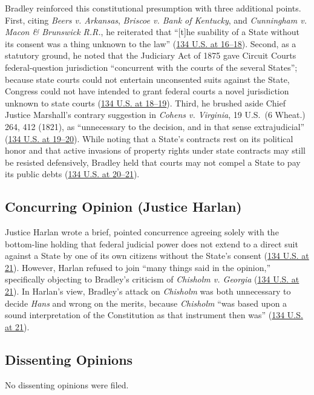\documentclass[12pt]{article}
\begin{document}
Bradley reinforced this constitutional presumption with three additional points. First, citing \textit{Beers v. Arkansas}, \textit{Briscoe v. Bank of Kentucky}, and \textit{Cunningham v. Macon \& Brunswick R.R.}, he reiterated that ``[t]he suability of a State without its consent was a thing unknown to the law'' (\href{https://supreme.justia.com/cases/federal/us/134/1/}{134 U.S. at 16--18}). Second, as a statutory ground, he noted that the Judiciary Act of 1875 gave Circuit Courts federal-question jurisdiction ``concurrent with the courts of the several States''; because state courts could not entertain unconsented suits against the State, Congress could not have intended to grant federal courts a novel jurisdiction unknown to state courts (\href{https://supreme.justia.com/cases/federal/us/134/1/}{134 U.S. at 18--19}). Third, he brushed aside Chief Justice Marshall's contrary suggestion in \textit{Cohens v. Virginia}, 19 U.S.\ (6 Wheat.) 264, 412 (1821), as ``unnecessary to the decision, and in that sense extrajudicial'' (\href{https://supreme.justia.com/cases/federal/us/134/1/}{134 U.S. at 19--20}). While noting that a State's contracts rest on its political honor and that active invasions of property rights under state contracts may still be resisted defensively, Bradley held that courts may not compel a State to pay its public debts (\href{https://supreme.justia.com/cases/federal/us/134/1/}{134 U.S. at 20--21}).

\subsection{Concurring Opinion (Justice Harlan)}
Justice Harlan wrote a brief, pointed concurrence agreeing solely with the bottom-line holding that federal judicial power does not extend to a direct suit against a State by one of its own citizens without the State's consent (\href{https://supreme.justia.com/cases/federal/us/134/1/}{134 U.S. at 21}). However, Harlan refused to join ``many things said in the opinion,'' specifically objecting to Bradley's criticism of \textit{Chisholm v. Georgia} (\href{https://supreme.justia.com/cases/federal/us/134/1/}{134 U.S. at 21}). In Harlan's view, Bradley's attack on \textit{Chisholm} was both unnecessary to decide \textit{Hans} and wrong on the merits, because \textit{Chisholm} ``was based upon a sound interpretation of the Constitution as that instrument then was'' (\href{https://supreme.justia.com/cases/federal/us/134/1/}{134 U.S. at 21}).

\subsection{Dissenting Opinions}
No dissenting opinions were filed.
\end{document}
